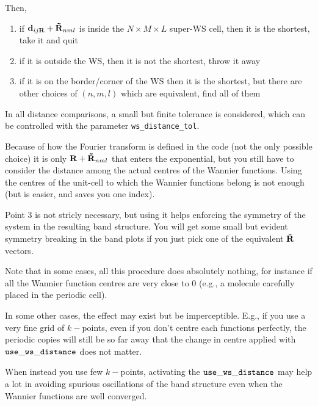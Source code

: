 Then,
\begin{enumerate}
\item if $\bm{\mathrm{d}}_{ij\bm{\mathrm{R}}}+ \bm{\mathrm{\tilde R}}_{nml}$ is inside the  
  $N\times M \times L$ super-WS cell, then it is the shortest, take it and quit

\item if it is outside the WS, then it is not the shortest, throw it away

\item if it is on the border/corner of the WS then it is the shortest, but there 
are other choices of $(n,m,l)$ which are equivalent, find all of them
\end{enumerate}

In all distance comparisons, a small but finite tolerance is considered,
which can be controlled with the parameter {\tt ws\_distance\_tol}.

Because of how the Fourier transform is defined in the \wannier{} code (not the only 
possible choice) it is only $\bm{\mathrm{R}}+\bm{\mathrm{\tilde R}}_{nml}$ 
that enters the exponential, but you still have to consider the distance 
among the actual centres of the Wannier functions. Using 
the centres of the unit-cell to which the Wannier functions belong 
is not enough (but is easier, and saves you one index).

Point 3 is not stricly necessary, but using it helps enforcing the 
symmetry of the system in the resulting band structure. You 
will get some small but evident symmetry breaking in the band 
plots if you just pick one of the equivalent $\bm{\mathrm{\tilde R}}$ vectors.

Note that in some cases, all this procedure does absolutely nothing,
for instance if all the Wannier function centres are very close to 0 
(e.g., a molecule carefully placed in the periodic cell).

In some other cases, the effect may exist but be imperceptible. E.g.,
if you use a very fine grid of $k-$points, even if you don't centre 
each functions perfectly, the periodic copies will still be so far away 
that the change in centre applied with $\tt use\_ws\_distance$ does not matter. 

When instead you use few $k-$points, activating the $\tt use\_ws\_distance$
may help a lot in avoiding spurious oscillations of the band structure
even when the Wannier functions are well converged.
